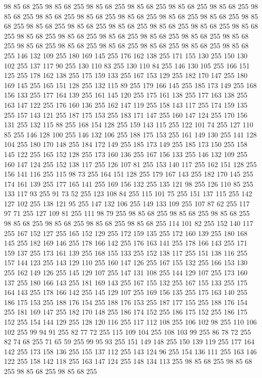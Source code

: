 98 85 68 255 98 85 68 255 98 85 68 255 98 85 68 255 98 85 68 255 98 85 68 255 98 85 68 255 98 85 68 255 98 85 68 255 98 85 68 255 98 85 68 255 98 85 68 255 98 85 68 255 98 85 68 255 98 85 68 255 98 85 68 255 98 85 68 255 98 85 68 255 98 85 68 255 98 85 68 255 98 85 68 255 98 85 68 255 98 85 68 255 98 85 68 255 98 85 68 255 98 85 68 255 98 85 68 255 98 85 68 255 98 85 68 255 98 85 68 255 98 85 68 255 146 132 109 255 180 169 145 255 176 162 138 255 171 155 130 255 150 130 102 255 137 117 90 255 130 110 83 255 130 110 84 255 146 130 105 255 166 151 125 255 178 162 138 255 175 159 133 255 167 153 129 255 182 170 147 255 180 169 145 255 165 151 128 255 132 115 89 255 179 166 145 255 185 173 149 255 168 156 133 255 177 164 139 255 161 145 120 255 175 161 138 255 177 163 138 255 163 147 122 255 176 160 136 255 162 147 119 255 158 143 117 255 174 159 135 255 157 143 121 255 187 175 153 255 183 171 147 255 160 147 124 255
170 156 131 255 132 115 88 255 168 154 128 255 159 143 115 255 122 101 74 255 127 110 85 255 146 128 100 255 146 132 106 255 188 175 153 255 161 149 130 255 141 128 104 255 180 170 148 255 184 172 149 255 185 173 149 255 185 173 150 255 158 145 122 255 165 152 128 255 173 160 136 255 167 156 133 255 146 132 109 255 160 147 124 255 152 138 117 255 126 107 81 255 153 140 117 255 162 151 128 255 156 141 116 255 115 98 73 255 164 151 128 255 179 167 143 255 182 170 145 255 174 161 139 255 177 165 141 255 169 156 132 255 135 121 98 255 126 110 85 255 133 117 93 255 91 73 52 255 123 108 84 255 115 101 75 255 151 137 115 255 142 127 102 255 138 121 95 255 147 132 106 255 149 133 109 255 107 87 62 255 117 97 71 255 127 109 81 255 111 98 79 255 98 85 68 255 98 85 68 255 98 85 68 255 98 85 68 255 98 85 68 255 98 85 68 255 98 85 68 255 114 101 82 255 152 140 117 255 167 152 127 255 165 152 129 255 172 159 135 255 172 160 139 255 180 168 145 255 182 169 146 255 178 166 142 255
176 163 141 255 178 166 143 255 171 159 137 255 173 161 139 255 168 155 133 255 152 138 117 255 151 138 116 255 157 144 123 255 143 129 110 255 160 147 126 255 167 155 132 255 166 153 130 255 162 149 126 255 145 129 107 255 147 131 108 255 144 129 107 255 173 160 137 255 180 166 143 255 181 169 143 255 167 155 132 255 167 155 133 255 175 164 143 255 178 166 142 255 145 129 107 255 169 156 135 255 175 163 140 255 186 175 153 255 188 176 154 255 188 176 153 255 187 177 155 255 188 176 154 255 181 169 147 255 182 170 148 255 186 174 152 255 186 175 152 255 186 175 152 255 154 144 129 255 128 120 116 255 117 112 108 255 106 102 98 255 110 106 102 255 99 94 91 255 82 77 72 255 115 109 104 255 108 103 99 255 86 78 72 255 82 74 68 255 71 65 59 255 99 95 93 255 151 149 148 255 150 139 119 255 177 164 142 255 173 158 136 255 155 137 112 255 143 124 96 255 154 136 111 255 163 146 122 255 158 142 118 255 163 147 124 255 148 134 113 255 98 85 68 255 98 85 68 255 98 85 68 255 98 85 68 255
